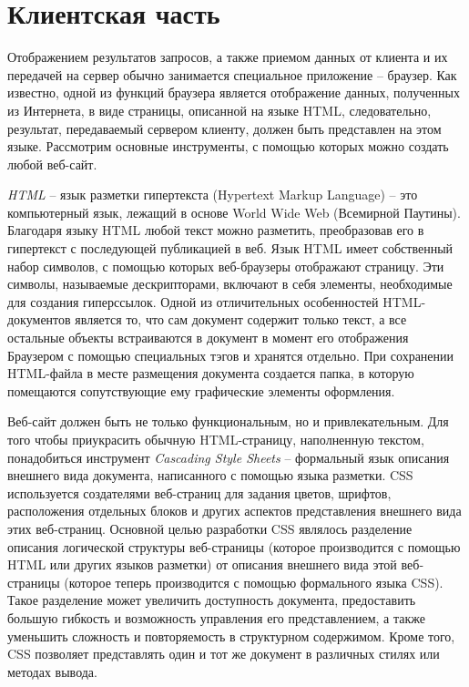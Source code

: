 \section {Клиентская часть}

Отображением результатов запросов, а также приемом данных от клиента и их передачей на сервер обычно занимается специальное приложение -- браузер. Как известно, одной из функций браузера является отображение данных, полученных из Интернета, в виде страницы, описанной на языке HTML, следовательно, результат, передаваемый сервером клиенту, должен быть представлен на этом языке.
Рассмотрим основные инструменты, с помощью которых можно создать любой веб-сайт.

{\itshape HTML } --  язык разметки гипертекста (Hypertext Markup Language)  -- это компьютерный язык, лежащий в основе World Wide Web (Всемирной Паутины). Благодаря языку HTML любой текст можно разметить, преобразовав его в гипертекст с последующей публикацией в веб.
Язык HTML имеет собственный набор символов, с помощью которых веб-браузеры отображают страницу. Эти символы, называемые дескрипторами, включают в себя элементы, необходимые для создания гиперссылок.
Одной из отличительных особенностей HTML-документов является то, что сам документ содержит только текст, а все остальные объекты встраиваются в документ в момент его отображения Браузером с помощью специальных тэгов и хранятся отдельно. При сохранении HTML-файла в месте размещения документа создается папка, в которую помещаются сопутствующие ему графические элементы оформления\cite{php}.

Веб-сайт должен быть не только функциональным, но и привлекательным. Для того чтобы приукрасить обычную HTML-страницу, наполненную текстом, понадобиться инструмент {\itshape Cascading Style Sheets } -- формальный язык описания внешнего вида документа, написанного с помощью языка разметки.  CSS используется создателями веб-страниц для задания цветов, шрифтов, расположения отдельных блоков и других аспектов представления внешнего вида этих веб-страниц. Основной целью разработки CSS являлось разделение описания логической структуры веб-страницы (которое производится с помощью HTML или других языков разметки) от описания внешнего вида этой веб-страницы (которое теперь производится с помощью формального языка CSS). Такое разделение может увеличить доступность документа, предоставить большую гибкость и возможность управления его представлением, а также уменьшить сложность и повторяемость в структурном содержимом. Кроме того, CSS позволяет представлять один и тот же документ в различных стилях или методах вывода\cite{php}.

